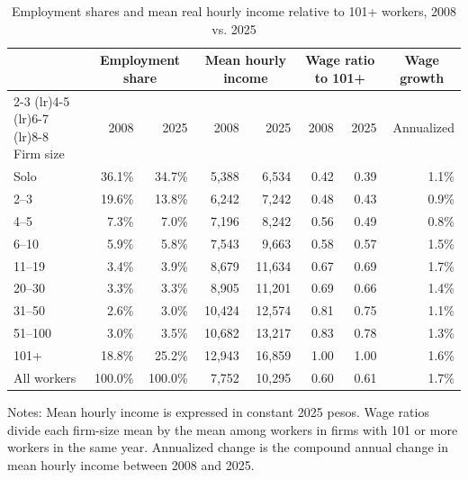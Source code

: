 \begin{table}[htbp]
  \centering
  \caption{Employment shares and mean real hourly income relative to 101+ workers, 2008 vs. 2025}
  \label{tab:descriptive-core-size-2008-2025-101-reference}
  \small
  \begin{tabular}{lrrrrrrr}
    \toprule
    & \multicolumn{2}{c}{Employment share} & \multicolumn{2}{c}{Mean hourly income} & \multicolumn{2}{c}{Wage ratio to 101+} & \multicolumn{1}{c}{Wage growth} \\
    \cmidrule(lr){2-3} \cmidrule(lr){4-5} \cmidrule(lr){6-7} \cmidrule(lr){8-8}
    Firm size & 2008 & 2025 & 2008 & 2025 & 2008 & 2025 & Annualized \\
    \midrule
    Solo & 36.1\% & 34.7\% &  5,388 &  6,534 & 0.42 & 0.39 & 1.1\% \\
    2--3 & 19.6\% & 13.8\% &  6,242 &  7,242 & 0.48 & 0.43 & 0.9\% \\
    4--5 & 7.3\% & 7.0\% &  7,196 &  8,242 & 0.56 & 0.49 & 0.8\% \\
    6--10 & 5.9\% & 5.8\% &  7,543 &  9,663 & 0.58 & 0.57 & 1.5\% \\
    11--19 & 3.4\% & 3.9\% &  8,679 & 11,634 & 0.67 & 0.69 & 1.7\% \\
    20--30 & 3.3\% & 3.3\% &  8,905 & 11,201 & 0.69 & 0.66 & 1.4\% \\
    31--50 & 2.6\% & 3.0\% & 10,424 & 12,574 & 0.81 & 0.75 & 1.1\% \\
    51--100 & 3.0\% & 3.5\% & 10,682 & 13,217 & 0.83 & 0.78 & 1.3\% \\
    101+ & 18.8\% & 25.2\% & 12,943 & 16,859 & 1.00 & 1.00 & 1.6\% \\
    \addlinespace
    All workers & 100.0\% & 100.0\% &  7,752 & 10,295 & 0.60 & 0.61 & 1.7\% \\
    \bottomrule
  \end{tabular}
  \vspace{0.3em}
  \begin{minipage}{0.95\textwidth}
  \footnotesize
  Notes: Mean hourly income is expressed in constant 2025 pesos. Wage ratios divide each firm-size mean by the mean among workers in firms with 101 or more workers in the same year. Annualized change is the compound annual change in mean hourly income between 2008 and 2025.
  \end{minipage}
\end{table}
